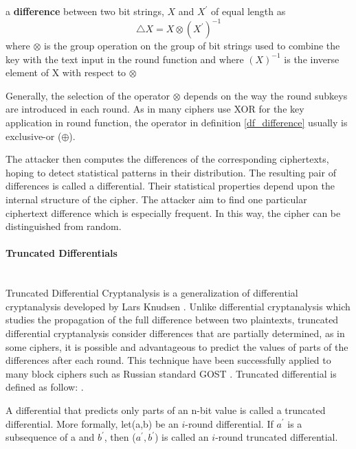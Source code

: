 \begin{mydef} \label{df_difference}
	a \textbf{difference} between two bit strings, $X$ and $X^{'}$ of equal length as $$\triangle X = X \otimes (X^{'})^{-1}$$
	where $\otimes$ is the group operation on the group of bit strings used to combine the key with the text input in the round function and where $(X)^{-1}$ is the inverse element of X with respect to $\otimes$
\end{mydef}

Generally, the selection of the operator $\otimes$ depends on the way the round subkeys are introduced in each round. As in many ciphers use XOR for the key application in round function, the operator in definition \ref{df_difference} usually is exclusive-or ($\oplus$).

The attacker then computes the differences of the corresponding ciphertexts, hoping to detect statistical patterns in their distribution. The resulting pair of differences is called a differential. Their statistical properties depend upon the internal structure of the cipher. The attacker aim to find one particular ciphertext difference which is especially frequent. In this way, the cipher can be distinguished from random.

\paragraph{Truncated Differentials} \mbox{ } \\
Truncated Differential Cryptanalysis is a generalization of differential cryptanalysis developed by Lars Knudsen \cite{Knudsen95}. Unlike differential cryptanalysis which studies the propagation of the full difference between two plaintexts, truncated differential cryptanalysis consider differences that are partially determined, as in some ciphers, it is possible and advantageous to predict the values of parts of the differences after each round. This technique have been successfully applied to many block ciphers such as Russian standard GOST \cite{gostdc2,TheoPhD,courtois2015can}. Truncated differential is defined as follow: \cite{Knudsen95}.

\begin{mydef}
	A differential that predicts only parts of an n-bit value is called a truncated differential. More formally, let(a,b) be an $i$-round differential. If $a^{'}$ is a subsequence of a and $b^{'}$, then ($a^{'},b^{'}$) is called an $i$-round truncated differential.
\end{mydef}

